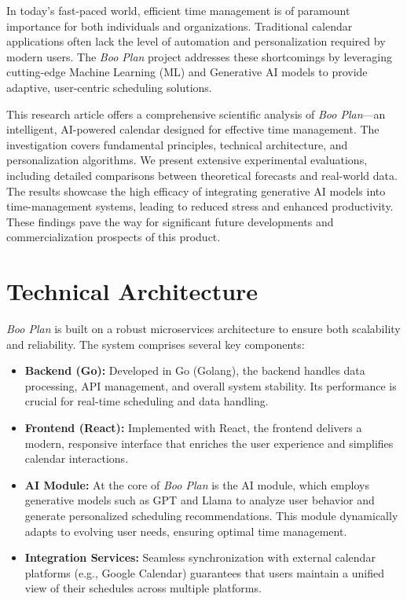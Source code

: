 \documentclass[14pt, english]{gost-7-32} %
\begin{document}

\introduction

In today's fast-paced world, efficient time management is of paramount importance for both individuals and organizations. Traditional calendar applications often lack the level of automation and personalization required by modern users. The \textit{Boo Plan} project addresses these shortcomings by leveraging cutting-edge Machine Learning (ML) and Generative AI models to provide adaptive, user-centric scheduling solutions.

This research article offers a comprehensive scientific analysis of \textit{Boo Plan}---an intelligent, AI-powered calendar designed for effective time management. The investigation covers fundamental principles, technical architecture, and personalization algorithms. We present extensive experimental evaluations, including detailed comparisons between theoretical forecasts and real-world data. The results showcase the high efficacy of integrating generative AI models into time-management systems, leading to reduced stress and enhanced productivity. These findings pave the way for significant future developments and commercialization prospects of this product.

\section{Technical Architecture}

\textit{Boo Plan} is built on a robust microservices architecture to ensure both scalability and reliability. The system comprises several key components:

\begin{itemize}
    \item \textbf{Backend (Go):} Developed in Go (Golang), the backend handles data processing, API management, and overall system stability. Its performance is crucial for real-time scheduling and data handling.
    \item \textbf{Frontend (React):} Implemented with React, the frontend delivers a modern, responsive interface that enriches the user experience and simplifies calendar interactions.
    \item \textbf{AI Module:} At the core of \textit{Boo Plan} is the AI module, which employs generative models such as GPT and Llama to analyze user behavior and generate personalized scheduling recommendations. This module dynamically adapts to evolving user needs, ensuring optimal time management.
    \item \textbf{Integration Services:} Seamless synchronization with external calendar platforms (e.g., Google Calendar) guarantees that users maintain a unified view of their schedules across multiple platforms.
\end{itemize}
\end{document}
